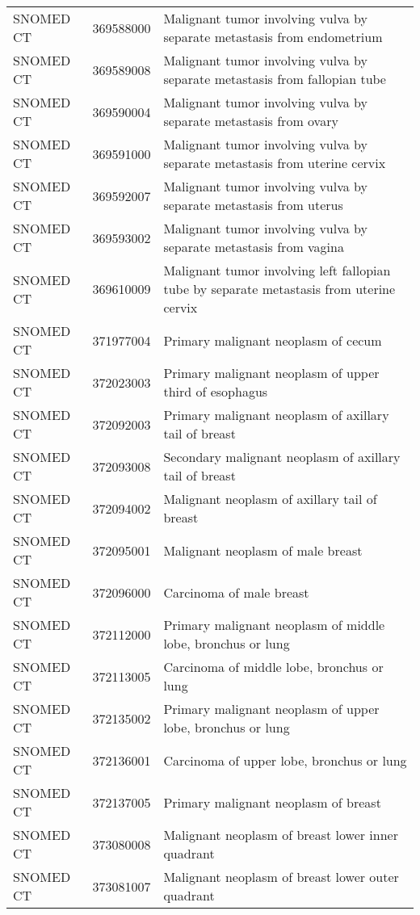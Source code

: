 \begin{longtable}{p{}p{}p{}}
  SNOMED CT & 369588000 & Malignant tumor involving vulva by separate metastasis from endometrium \\ 
  SNOMED CT & 369589008 & Malignant tumor involving vulva by separate metastasis from fallopian tube \\ 
  SNOMED CT & 369590004 & Malignant tumor involving vulva by separate metastasis from ovary \\ 
  SNOMED CT & 369591000 & Malignant tumor involving vulva by separate metastasis from uterine cervix \\ 
  SNOMED CT & 369592007 & Malignant tumor involving vulva by separate metastasis from uterus \\ 
  SNOMED CT & 369593002 & Malignant tumor involving vulva by separate metastasis from vagina \\ 
  SNOMED CT & 369610009 & Malignant tumor involving left fallopian tube by separate metastasis from uterine cervix \\ 
  SNOMED CT & 371977004 & Primary malignant neoplasm of cecum \\ 
  SNOMED CT & 372023003 & Primary malignant neoplasm of upper third of esophagus \\ 
  SNOMED CT & 372092003 & Primary malignant neoplasm of axillary tail of breast \\ 
  SNOMED CT & 372093008 & Secondary malignant neoplasm of axillary tail of breast \\ 
  SNOMED CT & 372094002 & Malignant neoplasm of axillary tail of breast \\ 
  SNOMED CT & 372095001 & Malignant neoplasm of male breast \\ 
  SNOMED CT & 372096000 & Carcinoma of male breast \\ 
  SNOMED CT & 372112000 & Primary malignant neoplasm of middle lobe, bronchus or lung \\ 
  SNOMED CT & 372113005 & Carcinoma of middle lobe, bronchus or lung \\ 
  SNOMED CT & 372135002 & Primary malignant neoplasm of upper lobe, bronchus or lung \\ 
  SNOMED CT & 372136001 & Carcinoma of upper lobe, bronchus or lung \\ 
  SNOMED CT & 372137005 & Primary malignant neoplasm of breast \\ 
  SNOMED CT & 373080008 & Malignant neoplasm of breast lower inner quadrant \\ 
  SNOMED CT & 373081007 & Malignant neoplasm of breast lower outer quadrant \\ 

\end{longtable}
